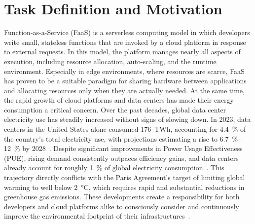 \clearpage
\section{Task Definition and Motivation}

Function-as-a-Service (FaaS) is a serverless computing model in which developers write small, stateless functions that are invoked by a cloud platform in response to external requests.
In this model, the platform manages nearly all aspects of execution, including resource allocation, auto-scaling, and the runtime environment.
Especially in edge environments, where resources are scarce, FaaS has proven to be a suitable paradigm for sharing hardware between applications and allocating resources only when they are actually needed.
At the same time, the rapid growth of cloud platforms and data centers has made their energy consumption a critical concern.
Over the past decades, global data center electricity use has steadily increased without signs of slowing down.
In 2023, data centers in the United States alone consumed \SI{176}{TWh}, accounting for \SI{4.4}{\percent} of the country's total electricity use, with projections estimating a rise to \SIrange{6.7}{12}{\percent} by 2028~\cite{shehabi_united_2024}.
Despite significant improvements in Power Usage Effectiveness (PUE), rising demand consistently outpaces efficiency gains, and data centers already account for roughly \SI{1}{\percent} of global electricity consumption~\cite{masanet_recalibrating_2020,sharma_jevons_2017,gandhi_metrics_2023}.
This trajectory directly conflicts with the Paris Agreement's target of limiting global warming to well below \SI{2}{\celsius}, which requires rapid and substantial reductions in greenhouse gas emissions.
These developments create a responsibility for both developers and cloud platforms alike to consciously consider and continuously improve the environmental footprint of their infrastructures~\cite{chien_driving_2021}.

